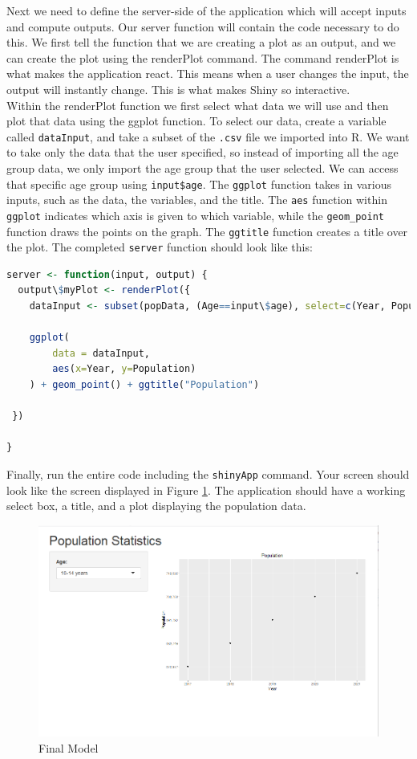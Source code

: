 Next we need to define the server-side of the application which will accept inputs and compute outputs.
Our server function will contain the code necessary to do this.
We first tell the function that we are creating a plot as an output, and we can create the plot using the renderPlot command.
The command renderPlot is what makes the application react.
This means when a user changes the input, the output will instantly change. This is what makes Shiny so interactive.\\
Within the renderPlot function we first select what data we will use and then plot that data using the ggplot function.
To select our data, create a variable called \texttt{dataInput}, and take a subset of the \texttt{.csv} file we imported into R.
We want to take only the data that the user specified, so instead of importing all the age group data, we only import the age group that the user selected.
We can access that specific age group using \texttt{input\$age}.
The \texttt{ggplot} function takes in various inputs, such as the data, the variables, and the title.
The \texttt{aes} function within \texttt{ggplot} indicates which axis is given to which variable, while the \texttt{geom\_point} function draws the points on the graph.
The \texttt{ggtitle} function creates a title over the plot.
The completed \texttt{server} function should look like this: 
\begin{lstlisting}[language = R]
server <- function(input, output) {
  output\$myPlot <- renderPlot({
    dataInput <- subset(popData, (Age==input\$age), select=c(Year, Population, State))
    
    ggplot(
        data = dataInput, 
        aes(x=Year, y=Population)
    ) + geom_point() + ggtitle("Population")
    
 })
  
}
\end{lstlisting}
Finally, run the entire code including the \texttt{shinyApp} command.
Your screen should look like the screen displayed in Figure \ref{fig:example}.
The application should have a working select box, a title, and a plot displaying the population data.
\begin{figure}[h]
   \centering
   \includegraphics[width = .5\textwidth]{pictures/shiny/pop.PNG} 
   \caption{Final Model}
   \label{fig:example}
\end{figure}

